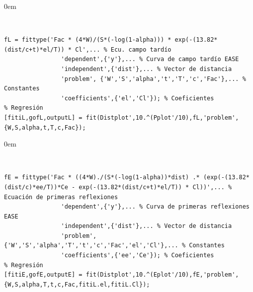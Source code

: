 \begin{description}
\itemsep0em
  \item[Campo tardío o cola reverberante:]~
  \vspace{-0.3cm}
\end{description}
\begin{lstlisting}[style=Matlab-color,numbers=none, caption={Líneas de código Matlab para obtener coeficientes de la teoría revisada corregida del campo tardío.},label=coefreverb]
% Parámetros de la regresión
fL = fittype('Fac * (4*W)/(S*(-log(1-alpha))) * exp(-(13.82*(dist/c+t)*el/T)) * Cl',... % Ecu. campo tardío
                'dependent',{'y'},... % Curva de campo tardío EASE
                'independent',{'dist'},... % Vector de distancia
                'problem', {'W','S','alpha','t','T','c','Fac'},... % Constantes
                'coefficients',{'el','Cl'}); % Coeficientes
% Regresión
[fitiL,gofL,outputL] = fit(Distplot',10.^(Pplot'/10),fL,'problem',{W,S,alpha,t,T,c,Fac});
\end{lstlisting}

\begin{description}
\itemsep0em
  \item[Primeras reflexiones:]~
  \vspace{-0.3cm}
\end{description}
\begin{lstlisting}[style=Matlab-color,numbers=none, caption={Líneas de código Matlab para obtener coeficientes de la teoría revisada corregida del campo temprano.},label=coeftemprano]
% Parámetros de la regresión
fE = fittype('Fac * ((4*W)./(S*(-log(1-alpha))*dist) .* (exp(-(13.82*(dist/c)*ee/T))*Ce - exp(-(13.82*(dist/c+t)*el/T)) * Cl))',... % Ecuación de primeras reflexiones
                'dependent',{'y'},... % Curva de primeras reflexiones EASE
                'independent',{'dist'},... % Vector de distancia
                'problem', {'W','S','alpha','T','t','c','Fac','el','Cl'},... % Constantes
                'coefficients',{'ee','Ce'}); % Coeficientes
% Regresión
[fitiE,gofE,outputE] = fit(Distplot',10.^(Eplot'/10),fE,'problem',{W,S,alpha,T,t,c,Fac,fitiL.el,fitiL.Cl});
\end{lstlisting}


